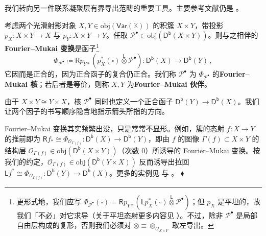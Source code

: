 \vspace*{0.5cm}
\noindent 我们转向另一件联系凝聚层有界导出范畴的重要工具。主要参考文献仍是 \cite{[Huy06]}。

\begin{Def}
	考虑两个光滑射影对象 $X,Y\in\text{obj}(\mathsf{Var}(\mathbb{K}))$ 的积簇 $X\times Y$，带投影 $p_X:X\times Y\rightarrow X$ 与 $p_Y:X\times Y\rightarrow Y$。任取 $\mathcal{P}^\bullet\in\text{obj}(\mathsf{D^b}(X\times Y))$。则与之相伴的\textbf{Fourier--Mukai 变换}是函子\footnote{更形式地，我们应写 $\Phi_{\mathcal{P}^\bullet}(\square)=\mathsf{R}p_{Y*}(\mathsf{L}p_X^*(\square)\overset{\mathsf{L}}{\otimes}\mathcal{P}^\bullet)$；但 $p_X$ 是平坦的，故我们「不必」对它求导（关于平坦态射更多内容见 \cite[第 III.9 节]{[Har77]}）。不过，除非 $\mathcal{P}^\bullet$ 是局部自由层构成的复形，否则我们必须对 $\otimes\equiv\otimes_{\mathcal{O}_{X\times Y}}$ 取左导出。}
	\begin{equation}
		\Phi_{\mathcal{P}^\bullet}\coloneqq\mathsf{R}p_{Y*}(p_X^*(\square)\overset{\mathsf{L}}{\otimes}\mathcal{P}^\bullet):\mathsf{D^b}(X)\rightarrow\mathsf{D^b}(Y)\,,
	\end{equation}
	它因而是正合的，因为正合函子的复合仍正合。我们称 $\mathcal{P}^\bullet$ 为 $\Phi_{\mathcal{P}^\bullet}$ 的\textbf{Fourier--Mukai 核}；若后者是等价，则称 $X,Y$ 为\textbf{Fourier--Mukai 伙伴}。
\end{Def}

由于 $X\times Y\cong Y\times X$，核 $\mathcal{P}^\bullet$ 同时也定义一个正合函子 $\mathsf{D^b}(Y)\rightarrow\mathsf{D^b}(X)$。我们让两个因子的书写顺序隐含地指示箭头所指的方向。

\begin{Ex}
	Fourier--Mukai 变换其实频繁出没，只是常常不显形。例如，簇的态射 $f:X\rightarrow Y$ 的推前即为 $\mathsf{R}f_*\cong\Phi_{\mathcal{O}_{\Gamma(f)}}:\mathsf{D^b}(X)\rightarrow\mathsf{D^b}(Y)$，即由 $f$ 的图像 $\Gamma(f)\subset X\times Y$ 的结构层 $\mathcal{O}_{\Gamma(f)}\in\text{obj}(\mathsf{D^b}(X\times Y))$（次数 0）所诱导的 Fourier--Mukai 变换。按我们的约定，$\mathcal{O}_{\Gamma(f)}\in\text{obj}(\mathsf{D^b}(Y\times X))$ 反而诱导出拉回 $\mathsf{L}f^*\cong \Phi_{\mathcal{O}_{\Gamma(f)}}:\mathsf{D^b}(Y)\rightarrow\mathsf{D^b}(X)$。更多的实例见 \cite[例 5.4]{[Huy06]} 与 \cite[第 3.4 节]{[Hoc19]}。				\hfill $\blacklozenge$
\end{Ex}

